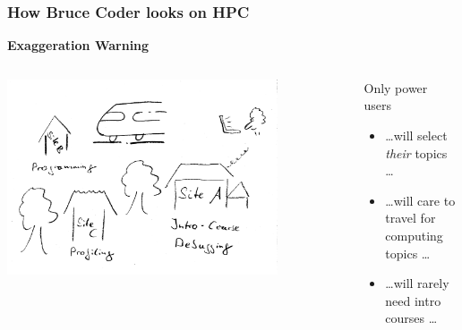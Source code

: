\begin{frame}
  \frametitle{How Bruce Coder looks on HPC}
  \centering
  {\bcattention \bf \large Exaggeration Warning \bcattention}
  \begin{columns}
    \begin{column}{.6\textwidth}
      \centering
      \includegraphics[width=0.8\textwidth]{images/poweruser}
    \end{column}
    \begin{column}{.4\textwidth}
      \pause
      Only power users 
      \begin{itemize}[<+->]
        \item \ldots will select \emph{their} topics \ldots
        \item \ldots will care to travel for computing topics \ldots
        \item \ldots will rarely need intro courses \ldots
      \end{itemize}
    \end{column}
  \end{columns}
\end{frame}

